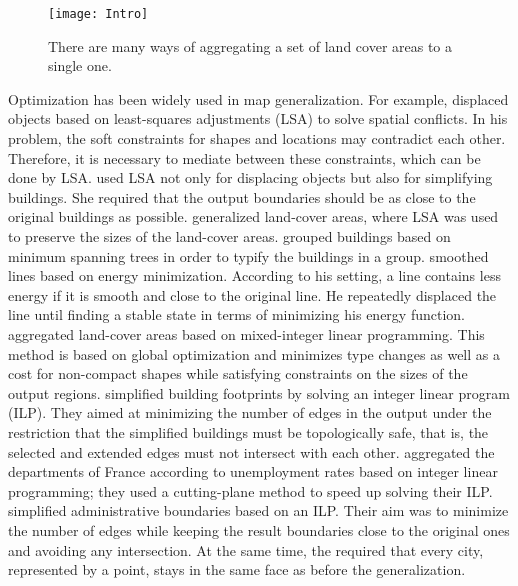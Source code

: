 
\begin{figure}[tb]
\centering
\texttt{[image: Intro]}
\caption{There are many ways of aggregating a set of land 
cover areas to a single one.}
\label{fig:Intro_SubdivisionName}
\end{figure}

Optimization has been widely used in map generalization.
For example, \textcite{Harrie1999} displaced objects 
based on least-squares adjustments (LSA)
to solve spatial conflicts.
In his problem, the soft constraints 
for shapes and locations may contradict each other.
Therefore, it is necessary 
to mediate between these constraints, 
which can be done by LSA.
\textcite{Sester2005Optimization} used LSA not only for 
displacing objects but also for simplifying buildings. 
She required that 
the output boundaries should be 
as close to the original buildings as possible.
\textcite{Tong2015AreaLSA} generalized land-cover areas,
where LSA was used to preserve the sizes of 
the land-cover areas.
\textcite{Regnauld2001} grouped buildings based on 
minimum spanning trees in order to typify
the buildings in a group.
\textcite{Burghardt2005Snakes} smoothed lines based on 
energy minimization. 
According to his setting, a line contains less energy
if it is smooth and close to the original line.
He repeatedly displaced the line 
until finding a stable state 
in terms of minimizing his energy function.
\textcite{HaunertWolff2010AreaAgg} aggregated land-cover areas
based on mixed-integer linear programming.
This method is based on global optimization and minimizes 
type changes as well as a cost for non-compact shapes 
while satisfying constraints on the sizes of the output regions.
\textcite{Haunertwolff2010Building} simplified building
footprints by solving an integer linear program (ILP).
They aimed at minimizing the number of edges in the output 
under the restriction that 
the simplified buildings must be topologically safe,
that is, the selected and extended edges must not intersect with 
each other.
\textcite{Oehrlein2017Aggregation} aggregated the departments 
of France according to unemployment rates based on integer 
linear programming; they used a cutting-plane method to 
speed up solving their ILP.
\textcite{Funke2017Simplification} simplified 
administrative boundaries based on an ILP.
Their aim was to minimize the number of edges
while keeping the result boundaries close to the original ones
and avoiding any intersection. 
At the same time, the required that every city, 
represented by a point, 
stays in the same face as before the generalization.




